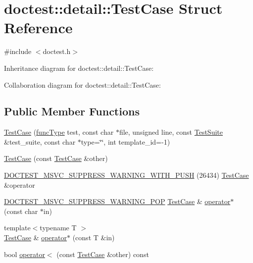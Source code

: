 \hypertarget{structdoctest_1_1detail_1_1TestCase}{}\section{doctest\+:\+:detail\+:\+:Test\+Case Struct Reference}
\label{structdoctest_1_1detail_1_1TestCase}


{\ttfamily \#include $<$doctest.\+h$>$}



Inheritance diagram for doctest\+:\+:detail\+:\+:Test\+Case\+:


Collaboration diagram for doctest\+:\+:detail\+:\+:Test\+Case\+:
\subsection*{Public Member Functions}
\begin{DoxyCompactItemize}
\item 
\hyperlink{structdoctest_1_1detail_1_1TestCase_a589d99e8322a4d830d5173545cd3dabe}{Test\+Case} (\hyperlink{namespacedoctest_1_1detail_a7b2c60631c5f4906b26acf2e6b0e6e45}{func\+Type} test, const char $\ast$file, unsigned line, const \hyperlink{structdoctest_1_1detail_1_1TestSuite}{Test\+Suite} \&test\+\_\+suite, const char $\ast$type=\char`\"{}\char`\"{}, int template\+\_\+id=-\/1)
\item 
\hyperlink{structdoctest_1_1detail_1_1TestCase_a0d8aa1f3d0cbd31f3bc4a74d9c6add23}{Test\+Case} (const \hyperlink{structdoctest_1_1detail_1_1TestCase}{Test\+Case} \&other)
\item 
\hyperlink{structdoctest_1_1detail_1_1TestCase_a3e767f89d496f2dc80ebbab72677c754}{D\+O\+C\+T\+E\+S\+T\+\_\+\+M\+S\+V\+C\+\_\+\+S\+U\+P\+P\+R\+E\+S\+S\+\_\+\+W\+A\+R\+N\+I\+N\+G\+\_\+\+W\+I\+T\+H\+\_\+\+P\+U\+SH} (26434) \hyperlink{structdoctest_1_1detail_1_1TestCase}{Test\+Case} \&operator
\item 
\hyperlink{doctest_8h_a540e6314c4b71317f3459f0117e14bc8}{D\+O\+C\+T\+E\+S\+T\+\_\+\+M\+S\+V\+C\+\_\+\+S\+U\+P\+P\+R\+E\+S\+S\+\_\+\+W\+A\+R\+N\+I\+N\+G\+\_\+\+P\+OP} \hyperlink{structdoctest_1_1detail_1_1TestCase}{Test\+Case} \& \hyperlink{structdoctest_1_1detail_1_1TestCase_a2bc7eff3ab5c26149f683f2354463cbd}{operator$\ast$} (const char $\ast$in)
\item 
{\footnotesize template$<$typename T $>$ }\\\hyperlink{structdoctest_1_1detail_1_1TestCase}{Test\+Case} \& \hyperlink{structdoctest_1_1detail_1_1TestCase_a7ff8c8e9a0e4515dbef926a835b447f9}{operator$\ast$} (const T \&in)
\item 
bool \hyperlink{structdoctest_1_1detail_1_1TestCase_a865f5906758263125b68b8d785a05ca1}{operator$<$} (const \hyperlink{structdoctest_1_1detail_1_1TestCase}{Test\+Case} \&other) const
\end{DoxyCompactItemize}
